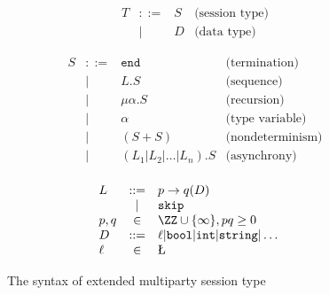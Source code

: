 \begin{figure}[ht]
  $$\begin{array}{lclr}
      T & ::= & S & \text{(session type)} \\
        & |   & D & \text{(data type)}
    \end{array}$$

  \begin{center}
    \begin{minipage}{0.48\textwidth}
      $$\begin{array}{lclr}
          S & ::= & \texttt{end}           & \text{(termination)}    \\
            & |   & L.S                    & \text{(sequence)}       \\
            & |   & \mu\alpha.S            & \text{(recursion)}      \\
            & |   & \alpha                 & \text{(type variable)}  \\
            & |   & (S+S)                  & \text{(nondeterminism)} \\
            & |   & (L_1|L_2|\ldots|L_n).S & \text{(asynchrony)}     \\
        \end{array}$$
    \end{minipage}
    \hfill
    \begin{minipage}{0.48\textwidth}
      $$\begin{array}{lclr}
          L    & ::= & p\rightarrow q(D)                                             & \\
               & |   & \texttt{skip}                                                   \\
          p,q  & \in & \ZZ\cup\{\infty\}, pq\ge 0                                    & \\
          D    & ::= & \ell | \texttt{bool} | \texttt{int} | \texttt{string} |\ldots & \\
          \ell & \in & \L                                                              \\
        \end{array}$$
    \end{minipage}
  \end{center}
  \caption{The syntax of extended multiparty session type}
  \label{syntax}
\end{figure}

